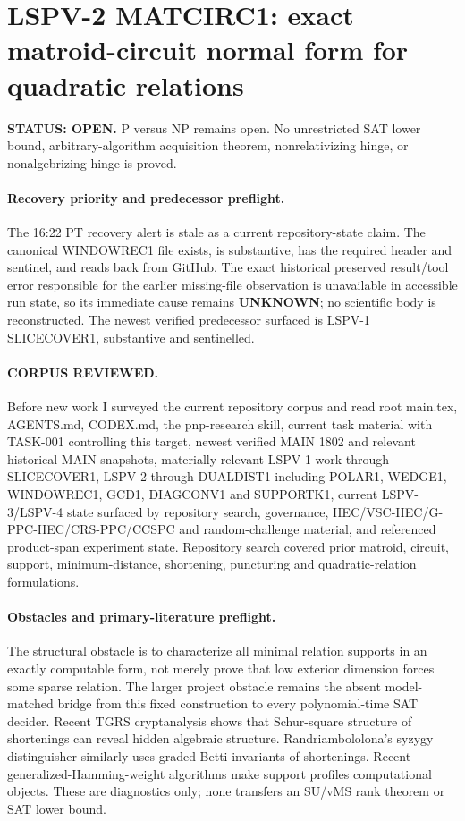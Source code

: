 \documentclass[11pt]{article}
\begin{document}
\section*{LSPV-2 MATCIRC1: exact matroid-circuit normal form for quadratic relations}
\textbf{STATUS: OPEN.} P versus NP remains open. No unrestricted SAT lower bound, arbitrary-algorithm acquisition theorem, nonrelativizing hinge, or nonalgebrizing hinge is proved.

\paragraph{Recovery priority and predecessor preflight.}
The 16:22 PT recovery alert is stale as a current repository-state claim. The canonical WINDOWREC1 file exists, is substantive, has the required header and sentinel, and reads back from GitHub. The exact historical preserved result/tool error responsible for the earlier missing-file observation is unavailable in accessible run state, so its immediate cause remains \textbf{UNKNOWN}; no scientific body is reconstructed. The newest verified predecessor surfaced is LSPV-1 SLICECOVER1, substantive and sentinelled.

\paragraph{CORPUS REVIEWED.}
Before new work I surveyed the current repository corpus and read root main.tex, AGENTS.md, CODEX.md, the pnp-research skill, current task material with TASK-001 controlling this target, newest verified MAIN 1802 and relevant historical MAIN snapshots, materially relevant LSPV-1 work through SLICECOVER1, LSPV-2 through DUALDIST1 including POLAR1, WEDGE1, WINDOWREC1, GCD1, DIAGCONV1 and SUPPORTK1, current LSPV-3/LSPV-4 state surfaced by repository search, governance, HEC/VSC-HEC/G-PPC-HEC/CRS-PPC/CCSPC and random-challenge material, and referenced product-span experiment state. Repository search covered prior matroid, circuit, support, minimum-distance, shortening, puncturing and quadratic-relation formulations.

\paragraph{Obstacles and primary-literature preflight.}
The structural obstacle is to characterize all minimal relation supports in an exactly computable form, not merely prove that low exterior dimension forces some sparse relation. The larger project obstacle remains the absent model-matched bridge from this fixed construction to every polynomial-time SAT decider. Recent TGRS cryptanalysis shows that Schur-square structure of shortenings can reveal hidden algebraic structure. Randriambololona's syzygy distinguisher similarly uses graded Betti invariants of shortenings. Recent generalized-Hamming-weight algorithms make support profiles computational objects. These are diagnostics only; none transfers an SU/vMS rank theorem or SAT lower bound.
\end{document}
